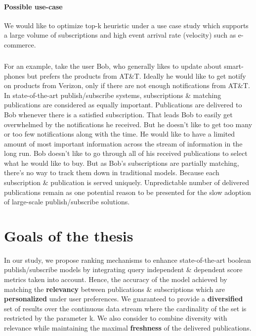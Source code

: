 \documentclass[a4paper,12pt,oneside]{book}
\theoremstyle{definition}
\theoremstyle{remark}
\begin{document}
\paragraph*{Possible use-case}
We would like to optimize top-k heuristic under a use case study which supports a large volume of subscriptions and high event arrival rate (velocity) such as e-commerce.
\subparagraph*{}
For an example, take the user Bob, who generally likes to update about smart-phones but prefers the products from AT\&T. Ideally he would like to get notify on products from Verizon, only if there are not enough notifications from AT\&T. In state-of-the-art publish/subscribe systems,
subscriptions \& matching publications are considered as equally important. Publications are delivered to Bob whenever there is a satisfied subscription. That leads Bob to easily get overwhelmed by the notifications he received. But he doesn't like to get too many or too few notifications along with the time. He would like to have a limited amount of most important information across the stream of information in the long run. Bob doesn't like to go through all of his received publications to select
what he would like to buy. But as Bob's subscriptions are partially matching, there's no way to track them down in traditional models. Because each subscription \& publication is served uniquely. Unpredictable number of delivered publications remain as one potential reason to be presented for the slow adoption of large-scale publish/subscribe solutions.


\section{Goals of the thesis}
\paragraph*{}
In our study, we propose ranking mechanisms to enhance state-of-the-art boolean publish/subscribe models by integrating query independent \& dependent score metrics taken into account. Hence, the accuracy of the model achieved by matching the \textbf{relevancy} between publications \& subscriptions which are \textbf{personalized} under user preferences. We guaranteed to provide a \textbf{diversified} set of results over the continuous data stream where the cardinality of the set is restricted by the parameter k. We also consider to combine diversity with relevance while maintaining the maximal \textbf{freshness} of the delivered publications.
\end{document}

